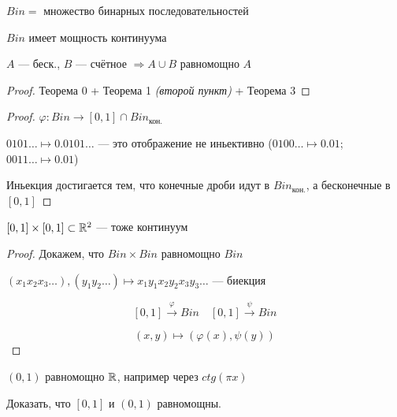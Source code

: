     \begin{theorem}
        $Bin=$ множество бинарных последовательностей

        $Bin$ имеет мощность континуума
    \end{theorem}
    \begin{lemma}
        $A$ --- беск., $B$ --- счётное $\Rightarrow A\cup B$ равномощно $A$
    \end{lemma}
    \begin{proof}
        Теорема 0 + Теорема 1 \textit{(второй пункт)} + Теорема 3
    \end{proof}
    \begin{proof}
        $\varphi : Bin\to [0,1]\cap Bin_{\text{кон.}}$

        $0101\ldots\mapsto0.0101\ldots$ --- это отображение не иньективно ($0100\ldots\mapsto0.01$; $0011\ldots\mapsto0.01$)

        Иньекция достигается тем, что конечные дроби идут в $Bin_{\text{кон.}}$, а бесконечные в $[0,1]$
    \end{proof}
    \begin{consequence}
        $[0,1]\times[0,1]\subset\mathbb{R}^2$ --- тоже континуум
    \end{consequence}
    \begin{proof}
        Докажем, что $Bin\times Bin$ равномощно $Bin$

        $(x_1x_2x_3\ldots), (y_1y_2\ldots)\mapsto x_1y_1x_2y_2x_3y_3\ldots$ --- биекция

        $$[0,1]\xrightarrow{\varphi} Bin \quad [0,1]\xrightarrow \psi Bin$$

        $$(x,y)\mapsto (\varphi(x), \psi(y))$$
    \end{proof}
    \begin{remark}
        $(0,1)$ равномощно $\mathbb{R}$, например через $ctg(\pi x)$
    \end{remark}

    \begin{exercise}
        Доказать, что $[0,1]$ и $(0,1)$ равномощны.
    \end{exercise}

